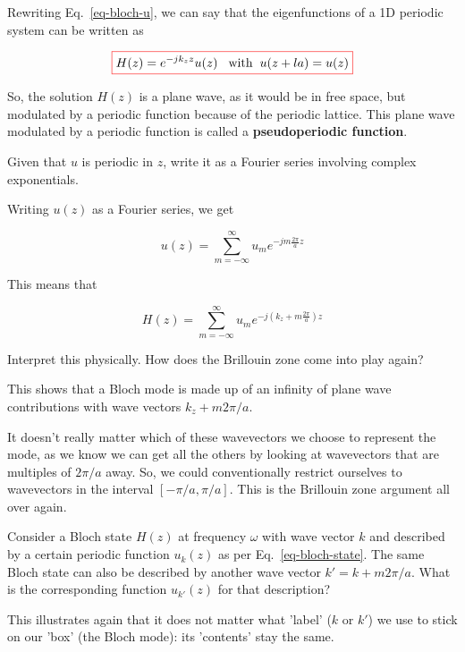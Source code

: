 Rewriting Eq.~\ref{eq-bloch-u}, we can say that the eigenfunctions of a 1D periodic system can be written as

\begin{equation}
\fbox{$\displaystyle  
    H(z) = e^{-j k_z z} u(z) \hspace{.3 cm} \textrm{with} \hspace{.2 cm} u(z+la) = u(z) \label{eq-bloch-state}
$}
\end{equation} 

So, the solution $H(z)$ is a plane wave, as it would be in free space, but modulated by a periodic function because of the periodic lattice. This plane wave modulated by a periodic function is called a \textbf{pseudoperiodic function}.

\begin{cue}
  Given that $u$ is periodic in $z$, write it as a Fourier series involving complex exponentials.
\end{cue} 

Writing $u(z)$ as a Fourier series, we get

\begin{equation}
u(z) =  \sum_{m=-\infty}^{\infty} u_m {e^{-j m \frac{2 \pi}{a} z}}
\end{equation} 

This means that

\begin{equation}
H(z)=  \sum_{m=-\infty}^{\infty} u_m {e^{-j \left( k_z + m \frac{2 \pi}{a} \right) z}}
\end{equation} 

\begin{cue}
Interpret this physically. How does the Brillouin zone come into play again?
\end{cue}

This shows that a Bloch mode is made up of an infinity of plane wave contributions with wave vectors $k_z + m 2 \pi / a$.

It doesn't really matter which of these wavevectors we choose to represent the mode, as we know we can get all the others by looking at wavevectors that are multiples of $2 \pi / a$ away. So, we could conventionally restrict ourselves to wavevectors in the interval $[-\pi/a,\pi/a]$. This is the Brillouin zone argument all over again.


\begin{exer}
Consider a Bloch state $H(z)$ at frequency $\omega$ with wave vector $k$ and described by a certain periodic function $u_k(z)$ as per Eq.~\ref{eq-bloch-state}. The same Bloch state can also be described by another wave vector $k' = k+m 2 \pi / a$. What is the corresponding function $u_{k'}(z)$ for that description?

This illustrates again that it does not matter what 'label' ($k$ or $k'$) we use to stick on our 'box' (the Bloch mode): its 'contents' stay the same.
\end{exer}


